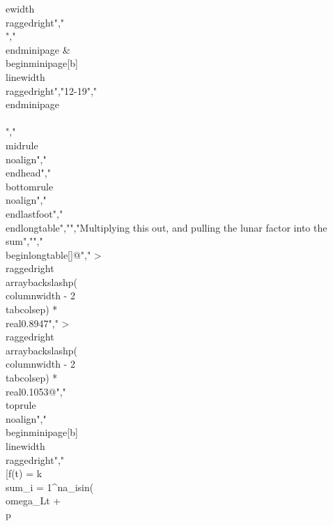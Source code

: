 {{{{{{{{{{ewidth}\\raggedright","\\[f(t) = s(t)L(t)\\]","\\end{minipage} & \\begin{minipage}[b]{\\linewidth}\\raggedright","12-19","\\end{minipage} \\\\","\\midrule\\noalign{}","\\endhead","\\bottomrule\\noalign{}","\\endlastfoot","\\end{longtable}","","Multiplying this out, and pulling the lunar factor into the sum","","\\begin{longtable}[]{@{}","  >{\\raggedright\\arraybackslash}p{(\\columnwidth - 2\\tabcolsep) * \\real{0.8947}}","  >{\\raggedright\\arraybackslash}p{(\\columnwidth - 2\\tabcolsep) * \\real{0.1053}}@{}}","\\toprule\\noalign{}","\\begin{minipage}[b]{\\linewidth}\\raggedright","\\[f(t) = k\\sum_{i = 1}^{n}{a_{i}sin(\\omega_{L}t + \\p}}}}}}}}}}
